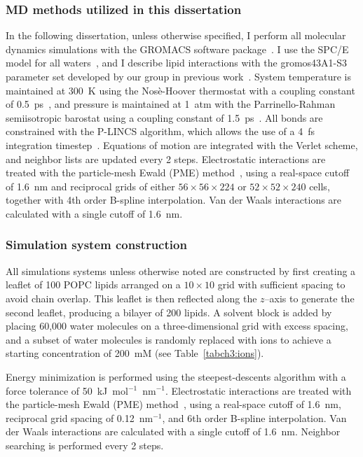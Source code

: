 \subsubsection{MD methods utilized in this dissertation}
In the following dissertation, unless otherwise specified, I perform all molecular dynamics simulations with the GROMACS software 
package~\cite{abraham:2015,pall:2014,van:2005,lindahl:2001,berendsen:1995,gromacs}.
I use the SPC/E model for all waters~\cite{spce}, and I describe lipid interactions
with the gromos43A1-S3 parameter set developed by our group in previous work~\cite{chiu:2009}.
System temperature is maintained at 300~K using the Nos\`e-Hoover thermostat
with a coupling constant of 0.5~ps~\cite{nose:1983}, and pressure is maintained
at 1~atm with the Parrinello-Rahman semiisotropic barostat using a coupling constant of 1.5~ps~\cite{parrinello:1981}.
All bonds are constrained with the P-LINCS algorithm, which allows the use of a 4~fs integration timestep~\cite{lincs}.
Equations of motion are integrated with the Verlet scheme, and neighbor lists are updated every 2 steps.
Electrostatic interactions are treated with the particle-mesh Ewald (PME) method~\cite{essmann:1995},
using a real-space cutoff of 1.6~nm and reciprocal grids of either
$56 \times 56 \times 224$ or $52 \times 52 \times 240$ cells,
together with 4th order B-spline interpolation.
Van der Waals interactions are calculated with a single cutoff of 1.6~nm.
\subsubsection{Simulation system construction}
All simulations systems unless otherwise noted are constructed by first creating a leaflet of 100 POPC lipids arranged
on a $10 \times 10$ grid with sufficient spacing to avoid chain overlap.
This leaflet is then reflected along the $z$--axis to generate the second
leaflet, producing a bilayer of 200 lipids. A solvent block is added by
placing 60,000 water molecules on a three-dimensional grid with excess spacing,
and a subset of water molecules is randomly replaced with ions to achieve a
starting concentration of 200~mM (see Table~\ref{tabch3:ions}).

Energy minimization is performed using the steepest-descents algorithm with a
force tolerance of 50~kJ~mol$^{-1}$~nm$^{-1}$. Electrostatic interactions are
treated with the particle-mesh Ewald (PME) method~\cite{essmann:1995}, using a
real-space cutoff of 1.6~nm, reciprocal grid spacing of 0.12~nm$^{-1}$, and
6th order B-spline interpolation. Van der Waals interactions are calculated
with a single cutoff of 1.6~nm. Neighbor searching is performed every 2 steps.

